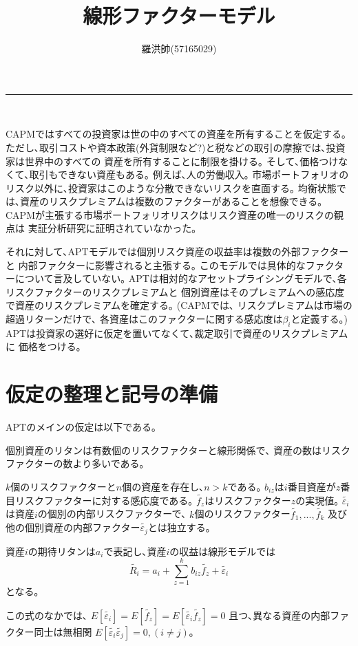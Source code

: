 \documentclass[uplatex,a4paper]{jsarticle}
\title{線形ファクターモデル}
\author{羅洪帥(57165029)}
\date{}
\begin{document}
\maketitle
\hrule
\medskip　　%

CAPMではすべての投資家は世の中のすべての資産を所有することを仮定する｡
ただし､取引コストや資本政策(外貨制限など?)と税などの取引の摩擦では､投資家は世界中のすべての
資産を所有することに制限を掛ける｡
そして､価格つけなくて､取引もできない資産もある｡
例えば､人の労働収入｡
市場ポートフォリオのリスク以外に､投資家はこのような分散できないリスクを直面する｡
均衡状態では､資産のリスクプレミアムは複数のファクターがあることを想像できる｡
CAPMが主張する市場ポートフォリオリスクはリスク資産の唯一のリスクの観点は
実証分析研究に証明されていなかった｡

それに対して､APTモデルでは個別リスク資産の収益率は複数の外部ファクターと
内部ファクターに影響されると主張する｡
このモデルでは具体的なファクターについて言及していない｡
APTは相対的なアセットプライシングモデルで､各リスクファクターのリスクプレミアムと
個別資産はそのプレミアムへの感応度で資産のリスクプレミアムを確定する｡
(CAPMでは､ リスクプレミアムは市場の超過リターンだけで､
各資産はこのファクターに関する感応度は$\beta_i$と定義する｡)
APTは投資家の選好に仮定を置いてなくて､裁定取引で資産のリスクプレミアムに
価格をつける｡

\section{仮定の整理と記号の準備}
APTのメインの仮定は以下である｡

個別資産のリタンは有数個のリスクファクターと線形関係で､
資産の数はリスクファクターの数より多いである｡

$k$個のリスクファクターと$n$個の資産を存在し､$n>k$である｡
$b_{iz}$は$i$番目資産が$z$番目リスクファクターに対する感応度である｡
$\tilde{f_{z}}$はリスクファクター$z$の実現値｡
$\tilde{\varepsilon_i}$は資産$i$の個別の内部リスクファクターで､
$k$個のリスクファクター$\tilde{f_{1}},...,\tilde{f_{k}}$
及び他の個別資産の内部ファクター$\tilde{\varepsilon_j}$とは独立する｡

資産$i$の期待リタンは$a_i$で表記し､資産$i$の収益は線形モデルでは
$$
\tilde{R_i} = a_i + \sum_{z=1}^{k} b_{iz} \tilde{f_{z}} + \tilde{\varepsilon_i}
$$
となる｡

この式のなかでは､
$
E[\tilde{\varepsilon_i}] = E[\tilde{f_z}] = E[\tilde{\varepsilon_i} \tilde{f_z}] = 0
$
且つ､異なる資産の内部ファクター同士は無相関
$
E[\tilde{\varepsilon_i} \tilde{\varepsilon_j}] = 0, (i \ne j)
$｡
\end{document}
